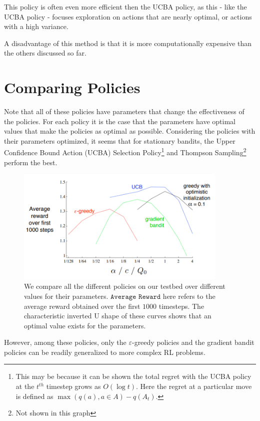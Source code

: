 \documentclass[12pt]{report}
\begin{document}
This policy is often even more efficient then the UCBA policy, as this - like the UCBA policy - focuses exploration on actions that are nearly optimal, or actions with a high variance.

A disadvantage of this method is that it is more computationally expensive than the others discussed so far.

\section{Comparing Policies}
Note that all of these policies have parameters that change the effectiveness of the policies. For each policy it is the case that the parameters have optimal values that make the policies as optimal as possible.
Considering the policies with their parameters optimized, it seems that for stationary bandits, the Upper Confidence Bound Action (UCBA) Selection Policy\footnote{This may be because it can be shown the total regret with the UCBA policy at the $t^{th}$ timestep grows as $O(\log t)$. Here the regret at a particular move is defined as $\max(q(a), a \in A) - q(A_{t})$.} and Thompson Sampling\footnote{Not shown in this graph} perform the best. 

\begin{figure}[h!]
    \centering
    \includegraphics[width=0.9\textwidth]{images/compare-bandit.png}
    \caption{We compare all the different policies on our testbed over different values for their parameters. $\texttt{Average Reward}$ here refers to the average reward obtained over the first $1000$ timesteps. The characteristic inverted U shape of these curves shows that an optimal value exists for the parameters.}
\end{figure}

However, among these policies, only the $\varepsilon$-greedy policies and the gradient bandit policies can be readily generalized to more complex RL problems.
\end{document}
